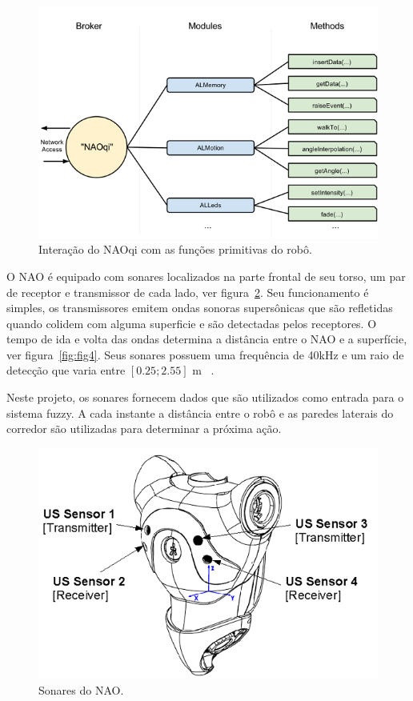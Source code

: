 \documentclass[twoside,conference,a4paper]{IEEEtran}
\begin{document}
\begin{figure}[ht]
\centering
\includegraphics[width=1\hsize]{figuras/naoqi.jpg}
\caption{Interação do NAOqi com as funções primitivas do robô.}
\label{fig:fig2}
\end{figure}

O NAO é equipado com sonares localizados na parte frontal de seu torso, um par de receptor e transmissor de cada lado, ver figura~\ref{fig:fig3}. Seu funcionamento é simples, os transmissores emitem ondas sonoras supersônicas que são refletidas quando colidem com alguma superficie e são detectadas pelos receptores. O tempo de ida e volta das ondas determina a distância entre o NAO e a superfície, ver figura~\ref{fig:fig4}. Seus sonares possuem uma frequência de 40kHz e um raio de detecção que varia entre $[0.25;2.55]$ m ~\cite{AldebaranNaoSonars}. 

Neste projeto, os sonares fornecem dados que são utilizados como entrada para o sistema fuzzy. A cada instante a distância entre o robô e as paredes laterais do corredor são utilizadas para determinar a próxima ação.

\begin{figure}[ht]
\centering
\includegraphics[width=1\hsize]{figuras/nao-sonar1.jpg}
\caption{Sonares do NAO.}
\label{fig:fig3}
\end{figure}
\end{document}
